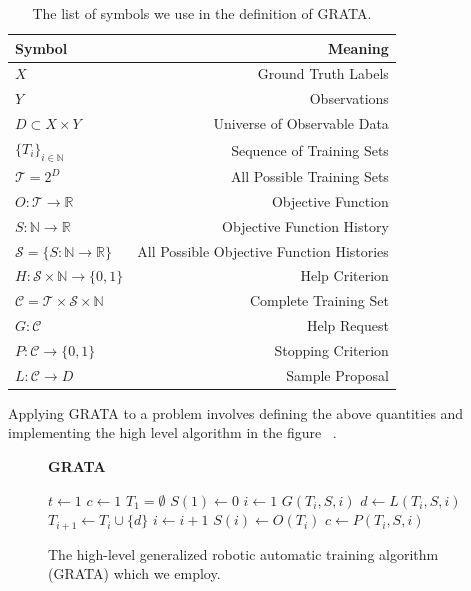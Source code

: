 \begin{table}
  \begin{center}
  \caption{The list of symbols we use in the definition of GRATA.}
  \begin{tabular}{lr}
    \toprule
    Symbol & Meaning \\ 
    \midrule
    $X$  & Ground Truth Labels \\
    $Y$  & Observations \\
    $D \subset X \times Y$  & Universe of Observable Data \\
    $\{T_i\}_{i \in \mathbb{N}}$  & Sequence of Training Sets \\
    $\mathcal{T} = 2^D$ & All Possible Training Sets \\
    $O: \mathcal{T} \to \mathbb{R}$ & Objective Function \\
    $S: \mathbb{N} \to \mathbb{R}$  & Objective Function History \\
    $\mathcal{S} = \{S: \mathbb{N} \to \mathbb{R}\}$  & All Possible Objective Function Histories \\
    $H: \mathcal{S} \times \mathbb{N} \to \{0,1\}$  & Help Criterion \\
    $\mathcal{C} = \mathcal{T} \times \mathcal{S} \times \mathbb{N}$  & Complete Training Set \\
    $G: \mathcal{C}$  & Help Request \\
    $P: \mathcal{C} \to \{0,1\}$  & Stopping Criterion \\
    $L: \mathcal{C} \to D$  & Sample Proposal \\
  \bottomrule
  \end{tabular}
  \end{center}
\end{table}



Applying GRATA to a problem involves defining the above quantities and implementing the high level algorithm
in the figure ~\citep{}.

\begin{figure}
  \textbf{GRATA}
  \begin{algorithmic}
  \STATE $t\gets 1$
  \STATE $c\gets 1$
  \STATE $T_1 = \emptyset$
  \STATE $S(1)\gets 0$
  \STATE $i\gets 1$
      \STATE $G(T_i, S,i)$
    \ELSE
      \STATE $d\gets L(T_i, S, i)$
      \STATE $T_{i+1}\gets T_i \cup \{d\}$
    \ENDIF
    \STATE $i\gets i+1$
    \STATE $S(i)\gets O(T_i)$
    \STATE $c\gets P(T_i, S, i)$
  \ENDWHILE
  \end{algorithmic}
  \caption{The high-level generalized robotic automatic training algorithm (GRATA) which we employ.}
\end{figure}



